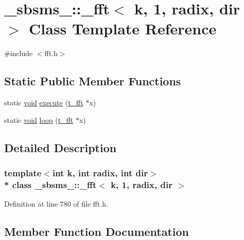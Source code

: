 \hypertarget{class__sbsms___1_1__fft_3_01k_00_011_00_01radix_00_01dir_01_4}{}\section{\+\_\+sbsms\+\_\+\+:\+:\+\_\+fft$<$ k, 1, radix, dir $>$ Class Template Reference}
\label{class__sbsms___1_1__fft_3_01k_00_011_00_01radix_00_01dir_01_4}


{\ttfamily \#include $<$fft.\+h$>$}

\subsection*{Static Public Member Functions}
\begin{DoxyCompactItemize}
\item 
static \hyperlink{sound_8c_ae35f5844602719cf66324f4de2a658b3}{void} \hyperlink{class__sbsms___1_1__fft_3_01k_00_011_00_01radix_00_01dir_01_4_a7083d5473387ab182bf7b5c0d59208ff}{execute} (\hyperlink{namespace__sbsms___af5c6f976b2da21c36853e3b0c5995a54}{t\+\_\+fft} $\ast$x)
\item 
static \hyperlink{sound_8c_ae35f5844602719cf66324f4de2a658b3}{void} \hyperlink{class__sbsms___1_1__fft_3_01k_00_011_00_01radix_00_01dir_01_4_a31a03fc7b9f72738176ca5959b7a4292}{loop} (\hyperlink{namespace__sbsms___af5c6f976b2da21c36853e3b0c5995a54}{t\+\_\+fft} $\ast$x)
\end{DoxyCompactItemize}


\subsection{Detailed Description}
\subsubsection*{template$<$int k, int radix, int dir$>$\\*
class \+\_\+sbsms\+\_\+\+::\+\_\+fft$<$ k, 1, radix, dir $>$}



Definition at line 780 of file fft.\+h.



\subsection{Member Function Documentation}
